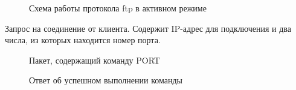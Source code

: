 \documentclass[a4paper, 14pt,russian]{article}
\begin{document}
	\begin{figure}[h!]
		\caption{Схема работы протокола ftp в активном режиме}
		\label{img:ftp_scheme}
	\end{figure}

	Запрос на соединение от клиента. Содержит IP-адрес для подключения и два числа, из которых находится номер порта.
	
	\begin{figure}[h!]
		\caption{Пакет, содержащий команду PORT}
		\label{img:ftp_act1}
	\end{figure}
	
	
	
	\begin{figure}[h!]
	\caption{Ответ об успешном выполнении команды}
	\label{img:ftp_act1}
	\end{figure}
	
\end{document}
